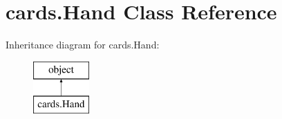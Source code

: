 \hypertarget{classcards_1_1Hand}{}\section{cards.\+Hand Class Reference}
\label{classcards_1_1Hand}
Inheritance diagram for cards.\+Hand\+:\begin{figure}[H]
\begin{center}
\leavevmode
\includegraphics[height=2.000000cm]{classcards_1_1Hand}
\end{center}
\end{figure}
